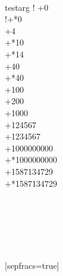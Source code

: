 {%
    \setcounter{@macro@counter}{1}%
    \@the@digits@text\\%
    \csname testarg\@the@digits@text\endcsname%
    \setprint!{\BooleanTrue}%
    \numToText+{0}\\
    \numToText!+*{0}\\
    \numToText+{4}\\
    \numToText+*{10}\\
    \numToText+*{14}\\
    \numToText+{40}\\
    \numToText+*{40}\\
    \numToText+{100}\\
    \numToText+{200}\\
    \numToText+{1000}\\
    \numToText+{124567}\\
    \numToText+{1234567}\\
    \numToText+{1000000000}\\
    \numToText+*{1000000000}\\
    \numToText+{1587134729}\\
    \numToText+*{1587134729}
    \\
    \\
    \\
    \\
    \\
    \\
    \\
    [sepfracs=true]\\
    \\
    \\
    \\
}

